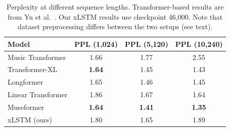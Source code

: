 \documentclass[conference]{IEEEtran}
\begin{document}
\begin{table}[htbp]
\centering
\caption{Perplexity at different sequence lengths. Transformer-based results are from Yu et al.\ \cite{yu2022museformer}. Our xLSTM results use checkpoint 46,000. Note that dataset preprocessing differs between the two setups (see text).}
\label{tab:ppl_comparison}
\begin{tabular}{lccc}
\toprule
\textbf{Model} & \textbf{PPL (1,024)} & \textbf{PPL (5,120)} & \textbf{PPL (10,240)} \\
\midrule
Music Transformer    & 1.66 & 1.77 & 2.55 \\
Transformer-XL       & \textbf{1.64} & 1.45 & 1.43 \\
Longformer           & 1.65 & 1.46 & 1.45 \\
Linear Transformer   & 1.86 & 1.67 & 1.64 \\
Museformer           & \textbf{1.64} & \textbf{1.41} & \textbf{1.35} \\
\midrule
xLSTM (ours)         & 1.80 & 1.65 & 1.89 \\
\bottomrule
\end{tabular}
\end{table}





    
    
    
\end{document}

